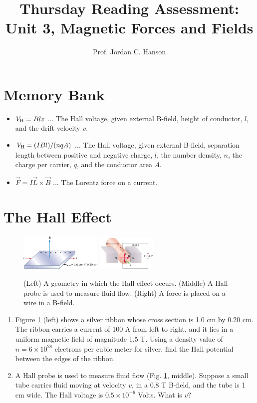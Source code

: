 \documentclass{article}
\begin{document}
\title{Thursday Reading Assessment: Unit 3, Magnetic Forces and Fields}
\author{Prof. Jordan C. Hanson}

\maketitle

\section{Memory Bank}

\begin{itemize}
\item $V_{\rm H} = B l v$ ... The Hall voltage, given external B-field, height of conductor, $l$, and the drift velocity $v$.
\item $V_{\rm H} = (I B l)/(n q A)$ ... The Hall voltage, given external B-field, separation length between positive and negative charge, $l$, the number density, $n$, the charge per carrier, $q$, and the conductor area $A$.
\item $\vec{F} = I\vec{L} \times \vec{B}$ ... The Lorentz force on a current.
\end{itemize}

\section{The Hall Effect}

\begin{figure}[ht]
\centering
\includegraphics[width=0.35\textwidth]{hall.jpeg}
\includegraphics[width=0.25\textwidth]{hall2.jpeg}
\caption{\label{fig:hall} (Left) A geometry in which the Hall effect occurs. (Middle) A Hall-probe is used to measure fluid flow. (Right) A force is placed on a wire in a B-field.}
\end{figure}

\begin{enumerate}
\item Figure \ref{fig:hall} (left) shows a silver ribbon whose cross section is 1.0 cm by 0.20 cm. The ribbon carries a current of 100 A from left to right, and it lies in a uniform magnetic field of magnitude 1.5 T. Using a density value of $n = 6 \times 10^{28}$ electrons per cubic meter for silver, find the Hall potential between the edges of the ribbon. \\ \vspace{4cm}
\item A Hall probe is used to measure fluid flow (Fig. \ref{fig:hall}, middle).  Suppose a small tube carries fluid moving at velocity $v$, in a 0.8 T B-field, and the tube is 1 cm wide.  The Hall voltage is $0.5 \times 10^{-6}$ Volts.  What is $v$?
\end{enumerate}
\end{document}
